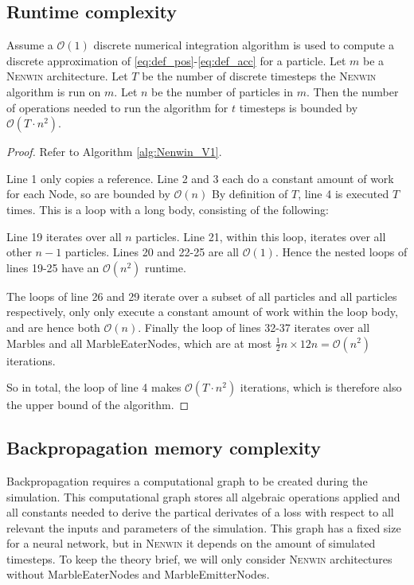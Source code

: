 \subsection{Runtime complexity}
\begin{lemma}
Assume a $\mathcal{O}(1)$ discrete numerical integration algorithm is used to compute a discrete approximation of \eqref{eq:def_pos}-\eqref{eq:def_acc} for a particle. Let $m$ be a \textsc{Nenwin} architecture. Let $T$ be the number of discrete timesteps the \textsc{Nenwin} algorithm is run on $m$. Let $n$ be the number of particles in $m$. Then the number of operations needed to run the algorithm for $t$ timesteps is bounded by $\mathcal{O}(T\cdot n^2)$.\label{lemma:runtime_complexity}
\end{lemma}
\begin{proof}
Refer to Algorithm \ref{alg:Nenwin_V1}. 

Line 1 only copies a reference. Line 2 and 3 each do a constant amount of work for each Node, so are bounded by $\mathcal{O}(n)$
By definition of $T$, line 4 is executed $T$ times. This is a loop with a long body, consisting of the following: 

Line 19 iterates over all $n$ particles. Line 21, within this loop, iterates over all other $n-1$ particles. Lines 20 and 22-25 are all $\mathcal{O}(1)$. Hence the nested loops of lines 19-25 have an $\mathcal{O}(n^2)$ runtime.

The loops of line 26 and 29 iterate over a subset of all particles and all particles respectively, only only execute a constant amount of work within the loop body, and are hence both $\mathcal{O}(n)$. Finally the loop of lines 32-37 iterates over all Marbles and all MarbleEaterNodes, which are at most $\frac{1}{2}n \times {1}{2}n = \mathcal{O}(n^2)$ iterations.

So in total, the loop of line 4 makes $\mathcal{O}(T \cdot n^ 2)$ iterations, which is therefore also the upper bound of the algorithm.
\end{proof}

\subsection{Backpropagation memory complexity}
Backpropagation requires a computational graph to be created during the simulation. This computational graph stores all algebraic operations applied and all constants needed to derive the partical derivates of a loss with respect to all relevant the inputs and parameters of the simulation. This graph has a fixed size for a neural network, but in \textsc{Nenwin} it depends on the amount of simulated timesteps. To keep the theory brief, we will only consider \textsc{Nenwin} architectures without MarbleEaterNodes and MarbleEmitterNodes.

